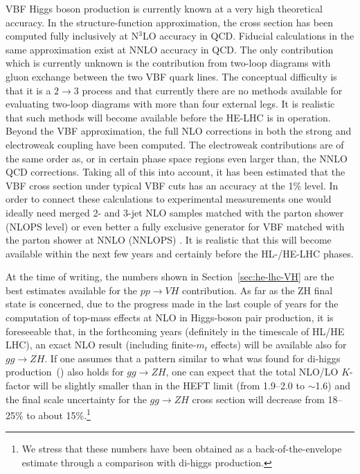 VBF Higgs boson production is currently known at a very high theoretical accuracy. In
the structure-function approximation, the cross section has been computed fully inclusively at
N$^3$LO accuracy in QCD. Fiducial calculations in the same approximation exist at NNLO accuracy in QCD. The
only contribution which is currently unknown is the contribution from two-loop
diagrams with gluon exchange between the two VBF quark lines. The conceptual
difficulty is that it is a $2 \to 3$ process and that currently there are no methods
available for evaluating two-loop diagrams with more than four external legs. It is
realistic that such methods will become available before the HE-LHC is in
operation. Beyond the VBF approximation, the full NLO corrections in both the
strong and electroweak coupling have been computed. The electroweak
contributions are of the same order as, or in certain phase space regions even
larger than, the NNLO QCD corrections. Taking all of this into account, it has
been estimated that the VBF cross section under typical VBF cuts has an accuracy
at the 1\% level. In order to connect these calculations to experimental
measurements one would ideally need merged 2- and 3-jet NLO samples matched with the parton shower~\cite{Nason:2009ai,Jager:2014vna} (NLOPS level) or even better a fully exclusive generator for VBF matched with the parton shower at  NNLO (NNLOPS) . It is realistic that this
will become available within the next few years and certainly before the
HL-/HE-LHC phases.
 


\label{sec:hl-lhc-VH}
At the time of writing, the numbers shown in Section~\ref{sec:he-lhc-VH}
are the best estimates
available for the $pp\rightarrow VH$ contribution. As far as the ZH final state is concerned, due to the progress made in the
last couple of years for the computation of top-mass effects at NLO in
Higgs-boson pair production, it is foreseeable that, in the forthcoming years
(definitely in the timescale of HL/HE LHC), an exact NLO result
(including finite-$m_t$ effects) will be available also for $gg\rightarrow ZH$. If
one assumes that a pattern similar to what was found for di-higgs
production~(\cite{Borowka:2016ypz}) also holds for $gg\rightarrow ZH$, one can expect
that the total NLO/LO $K$-factor will be slightly smaller than in the
HEFT limit (from 1.9--2.0 to $\sim$1.6) and the final scale uncertainty for
the $gg\rightarrow ZH$ cross section will decrease from 18--25\% to about 15\%.\footnote{We stress that these numbers have been obtained as a back-of-the-envelope estimate through a comparison with di-higgs production.}

